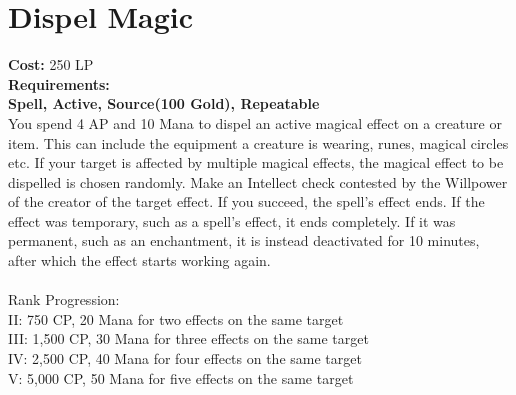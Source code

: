 \section{Dispel Magic}\label{spell:dispelMagic}
\textbf{Cost:} 250 LP\\
\textbf{Requirements:}\\
\textbf{Spell, Active, Source(100 Gold), Repeatable}\\
You spend 4 AP and 10 Mana to dispel an active magical effect on a creature or item.
This can include the equipment a creature is wearing, runes, magical circles etc.
If your target is affected by multiple magical effects, the magical effect to be dispelled is chosen randomly.
Make an Intellect check contested by the Willpower of the creator of the target effect.
If you succeed, the spell's effect ends.
If the effect was temporary, such as a spell's effect, it ends completely.
If it was permanent, such as an enchantment, it is instead deactivated for 10 minutes, after which the effect starts working again.\\
\\
Rank Progression:\\
II: 750 CP, 20 Mana for two effects on the same target\\
III: 1,500 CP, 30 Mana for three effects on the same target\\
IV: 2,500 CP, 40 Mana for four effects on the same target\\
V: 5,000 CP, 50 Mana for five effects on the same target\\